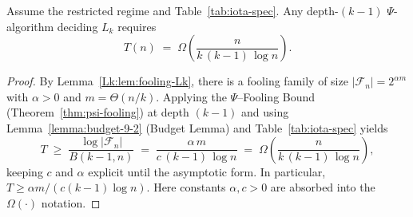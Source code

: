 \begin{theorem}[LB at depth $k{-}1$]\label{Lk:lb-main}
Assume the restricted regime and Table~\ref{tab:iota-spec}. Any depth-$(k{-}1)$ $\Psi$-algorithm deciding $L_k$ requires
\[
 T(n) \;=\; \Omega\!\left(\frac{n}{k\,(k{-}1)\,\log n}\right).
\]
\end{theorem}

\begin{proof}
By Lemma~\ref{Lk:lem:fooling-Lk}, there is a fooling family of size $|\mathcal{F}_n| = 2^{\alpha m}$ with $\alpha>0$ and $m=\Theta(n/k)$. Applying the $\Psi$--Fooling Bound (Theorem~\ref{thm:psi-fooling}) at depth $(k-1)$ and using Lemma~\ref{lemma:budget-9-2} (Budget Lemma) and Table~\ref{tab:iota-spec} yields
\[
 T \;\ge\; \frac{\log|\mathcal{F}_n|}{B(k-1,n)} \;=\; \frac{\alpha\,m}{c\,(k-1)\,\log n} \;=\; \Omega\!\left(\frac{n}{k\,(k-1)\,\log n}\right),
\]
keeping $c$ and $\alpha$ explicit until the asymptotic form. In particular, $T \ge \alpha m / ( c (k-1) \log n )$. Here constants $\alpha,c>0$ are absorbed into the $\Omega(\cdot)$ notation.
\end{proof}


